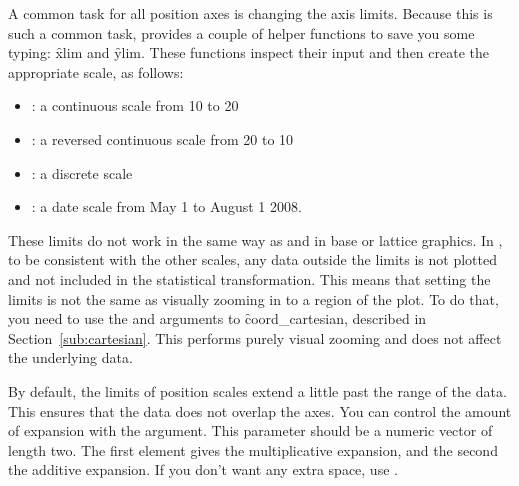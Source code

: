 A common task for all position axes is changing the axis limits.  Because this is such a common task, \ggplot provides a couple of helper functions to save you some typing: \f{xlim} and \f{ylim}.  These functions inspect their input and then create the appropriate scale, as follows:      

\begin{itemize}
  \item {}: a continuous scale from 10 to 20
  \item {}: a reversed continuous scale from 20 to 10
  \item {}: a discrete scale
  \item {}: a date scale from May 1 to August 1 2008.
\end{itemize}

These limits do not work in the same way as  and  in base or lattice graphics.  In \ggplot, to be consistent with the other scales, any data outside the limits is not plotted and not included in the statistical transformation.  This means that setting the limits is not the same as visually zooming in to a region of the plot.  To do that, you need to use the  and  arguments to \f{coord_cartesian}, described in Section~\ref{sub:cartesian}.  This performs purely visual zooming and does not affect the underlying data. 


By default, the limits of position scales extend a little past the range of the data. This ensures that the data does not overlap the axes. You can control the amount of expansion with the  argument. This parameter should be a numeric vector of length two. The first element gives the multiplicative expansion, and the second the additive expansion.  If you don't want any extra space, use . 

